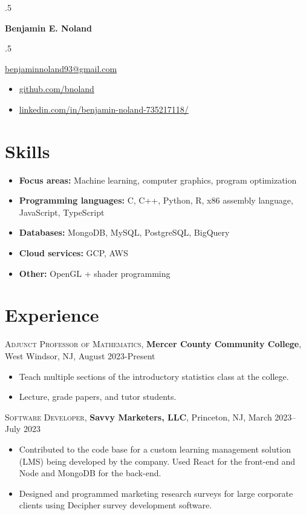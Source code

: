 \documentclass[letterpaper,10pt]{article}
\begin{document}
\begin{multicols}{2}
  \moveleft.5\hoffset\centerline{\Large\bf Benjamin E. Noland}
  \smallskip
  \moveleft.5\hoffset\centerline{\href{mailto:benjaminnoland93@gmail.com}{benjaminnoland93@gmail.com}}
  \columnbreak
  \begin{itemize}[label={}]
    \item \href{https://www.github.com/bnoland}{github.com/bnoland}
    \item \href{https://www.linkedin.com/in/benjamin-noland-735217118/}{linkedin.com/in/benjamin-noland-735217118/}
  \end{itemize}
\end{multicols}

\section*{Skills}

\begin{itemize}
  \item \textbf{Focus areas:} Machine learning, computer graphics, program optimization
  \item \textbf{Programming languages:} C, C++, Python, R, x86 assembly language, JavaScript, TypeScript
  \item \textbf{Databases:} MongoDB, MySQL, PostgreSQL, BigQuery
  \item \textbf{Cloud services:} GCP, AWS
  \item \textbf{Other:} OpenGL + shader programming
\end{itemize}

\section*{Experience}

\textsc{Adjunct Professor of Mathematics}, \textbf{Mercer County Community College}, West Windsor, NJ, August 2023-Present
\begin{itemize}
  \item Teach multiple sections of the introductory statistics class at the college.
  \item Lecture, grade papers, and tutor students.
\end{itemize}

\textsc{Software Developer}, \textbf{Savvy Marketers, LLC}, Princeton, NJ, March 2023--July 2023
\begin{itemize}
  \item Contributed to the code base for a custom learning management solution
        (LMS) being developed by the company. Used React for the front-end and
        Node and MongoDB for the back-end.
  \item Designed and programmed marketing research surveys for large corporate
        clients using Decipher survey development software.
\end{itemize}
\end{document}
